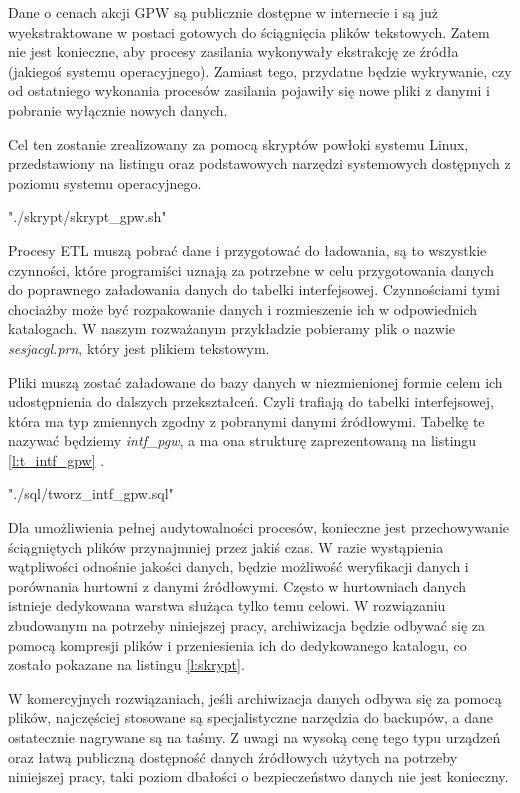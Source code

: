 Dane o cenach akcji GPW są publicznie dostępne w internecie 
 i są już wyekstraktowane w postaci gotowych do ściągnięcia plików tekstowych.
Zatem nie jest konieczne, aby procesy zasilania wykonywały ekstrakcję ze źródła (jakiegoś systemu operacyjnego).
Zamiast tego, przydatne będzie wykrywanie,
 czy od ostatniego wykonania procesów zasilania pojawiły się nowe pliki z danymi 
 i pobranie wyłącznie nowych danych.
 
Cel ten zostanie zrealizowany za pomocą skryptów powłoki systemu Linux,
 przedstawiony na listingu 
 oraz podstawowych narzędzi systemowych dostępnych z poziomu systemu operacyjnego. 


 {"./skrypt/skrypt_gpw.sh"} 


Procesy ETL muszą pobrać dane i przygotować do ładowania, 
 są to wszystkie czynności, które programiści uznają za potrzebne 
 w celu przygotowania danych do poprawnego załadowania danych do tabelki interfejsowej.
Czynnościami tymi chociażby może być rozpakowanie danych i rozmieszenie ich w odpowiednich katalogach.
W naszym rozważanym przykładzie pobieramy plik o nazwie \textit{sesjacgl.prn},
 który jest plikiem tekstowym.

Pliki muszą zostać załadowane do bazy danych w niezmienionej formie celem ich udostępnienia do dalszych przekształceń.
Czyli trafiają do tabelki interfejsowej,
 która ma typ zmiennych zgodny z pobranymi danymi źródłowymi. 
Tabelkę te nazywać będziemy \textit{intf\_pgw},
 a ma ona strukturę zaprezentowaną na listingu \ref{l:t_intf_gpw} .

 {"./sql/tworz_intf_gpw.sql"} 


Dla umożliwienia pełnej audytowalności procesów,
 konieczne jest przechowywanie ściągniętych plików przynajmniej przez jakiś czas.
W razie wystąpienia wątpliwości odnośnie jakości danych,
 będzie możliwość weryfikacji danych i porównania hurtowni z danymi źródłowymi. 
Często w hurtowniach danych istnieje dedykowana warstwa służąca tylko temu celowi. 
W rozwiązaniu zbudowanym na potrzeby niniejszej pracy,
 archiwizacja będzie odbywać się za pomocą kompresji plików i przeniesienia ich do dedykowanego katalogu, 
 co zostało pokazane na listingu \ref{l:skrypt}. 
 
W komercyjnych rozwiązaniach, jeśli archiwizacja danych odbywa się za pomocą plików,
 najczęściej stosowane są specjalistyczne narzędzia do backupów,
 a dane ostatecznie nagrywane są na taśmy.
Z uwagi na wysoką cenę tego typu urządzeń 
 oraz łatwą publiczną dostępność danych źródłowych użytych na potrzeby niniejszej pracy, 
 taki poziom dbałości o bezpieczeństwo danych nie jest konieczny. 

